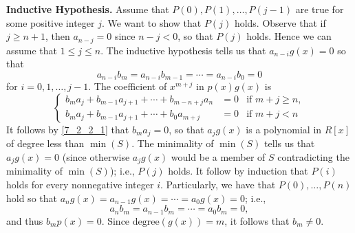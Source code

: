\begin{enumerate}
      \textbf{Inductive Hypothesis.} Assume that $P(0), P(1), \ldots, P(j-1)$
      are true for some positive integer $j$. We want to show that $P(j)$ holds.
      Observe that if $j \ge n + 1$, then $a_{n - j} = 0$ since $n - j < 0$, so
      that $P(j)$ holds. Hence we can assume that $1 \le j \le n$. The inductive
      hypothesis tells us that $a_{n-i}g(x) = 0$ so that
      \begin{equation} \label{7_2_2_1}
         a_{n-i}b_m = a_{n-i}b_{m-1} = \cdots = a_{n-i}b_0 = 0
      \end{equation}
      for $i = 0, 1, \ldots, j - 1$. The coefficient of $x^{m+j}$ in $p(x)g(x)$
      is
      \begin{equation*}
         \left\{
            \begin{array}{lcl}
               b_ma_j + b_{m-1}a_{j+1} + \cdots + b_{m-n+j}a_n &= 0 & \text{if }
                  m + j \ge n,\\
               b_ma_j + b_{m-1}a_{j+1} + \cdots + b_0a_{m+j} &= 0 & \text{if }
                  m + j < n
            \end{array} \right.
      \end{equation*}
      It follows by \eqref{7_2_2_1} that $b_ma_j = 0$, so that $a_jg(x)$ is a
      polynomial in $R[x]$ of degree less than $\min(S)$. The minimality of
      $\min(S)$ tells us that $a_jg(x) = 0$ (since otherwise $a_jg(x)$ would be
      a member of $S$ contradicting the minimality of $\min(S)$); i.e., $P(j)$
      holds. It follow by induction that $P(i)$ holds for every nonnegative
      integer $i$. Particularly, we have that $P(0), \ldots, P(n)$ hold so
      that $a_ng(x) = a_{n-1}g(x) = \cdots = a_0g(x) = 0$; i.e.,
      $$a_{n}b_m = a_{n-1}b_m = \cdots = a_{0}b_m = 0,$$
      and thus
      $b_mp(x) = 0$. Since $\text{degree}(g(x)) = m$, it follows that
      $b_m \neq 0$.


\end{enumerate}

